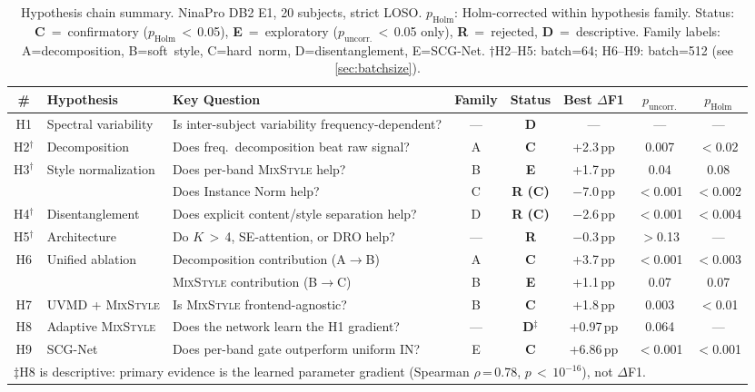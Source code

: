 \documentclass[conference]{IEEEtran}
\newcommand{\pp}{\,pp}
\newcommand{\mixstyle}{\textsc{MixStyle}}
\newcommand{\uvmd}{\textsc{UVMD}}
\begin{document}
\begin{table}[t]
\centering
\caption{Hypothesis chain summary. NinaPro DB2 E1, 20 subjects, strict LOSO. $p_{\mathrm{Holm}}$: Holm-corrected within hypothesis family. Status: \textbf{C}~=~confirmatory ($p_{\mathrm{Holm}}$\,$<$\,0.05), \textbf{E}~=~exploratory ($p_{\mathrm{uncorr.}}$\,$<$\,0.05 only), \textbf{R}~=~rejected, \textbf{D}~=~descriptive. Family labels: A=decomposition, B=soft~style, C=hard~norm, D=disentanglement, E=SCG-Net. $\dagger$H2--H5: batch=64; H6--H9: batch=512 (see \cref{sec:batchsize}).}
\label{tab:hypotheses}
\begin{tabular}{clp{4.8cm}ccccc}
\toprule
\# & Hypothesis & Key Question & Family & Status & Best $\Delta$F1 & $p_{\mathrm{uncorr.}}$ & $p_{\mathrm{Holm}}$ \\
\midrule
H1 & Spectral variability & Is inter-subject variability frequency-dependent? & --- & \textbf{D} & --- & --- & --- \\
H2$^\dagger$ & Decomposition & Does freq.\ decomposition beat raw signal? & A & \textbf{C} & +2.3\pp{} & 0.007 & $<$0.02 \\
H3$^\dagger$ & Style normalization & Does per-band \mixstyle{} help? & B & \textbf{E} & +1.7\pp{} & 0.04 & 0.08 \\
   &                     & Does Instance Norm help? & C & \textbf{R (C)} & $-$7.0\pp{} & $<$0.001 & $<$0.002 \\
H4$^\dagger$ & Disentanglement & Does explicit content/style separation help? & D & \textbf{R (C)} & $-$2.6\pp{} & $<$0.001 & $<$0.004 \\
H5$^\dagger$ & Architecture & Do $K$\,$>$\,4, SE-attention, or DRO help? & --- & \textbf{R} & $-$0.3\pp{} & $>$0.13 & --- \\
H6 & Unified ablation & Decomposition contribution (A$\to$B) & A & \textbf{C} & +3.7\pp{} & $<$0.001 & $<$0.003 \\
   &                   & \mixstyle{} contribution (B$\to$C) & B & \textbf{E} & +1.1\pp{} & 0.07 & 0.07 \\
H7 & \uvmd{} + \mixstyle{} & Is \mixstyle{} frontend-agnostic? & B & \textbf{C} & +1.8\pp{} & 0.003 & $<$0.01 \\
H8 & Adaptive \mixstyle{} & Does the network learn the H1 gradient? & --- & \textbf{D$^{\ddagger}$} & +0.97\pp{} & 0.064 & --- \\
H9 & SCG-Net & Does per-band gate outperform uniform IN? & E & \textbf{C} & +6.86\pp{} & $<$0.001 & $<$0.001 \\
\bottomrule
\multicolumn{8}{l}{\footnotesize $\ddagger$H8 is descriptive: primary evidence is the learned parameter gradient (Spearman $\rho$\,=\,0.78, $p$\,$<$\,$10^{-16}$), not $\Delta$F1.}
\end{tabular}
\end{table}
\end{document}
